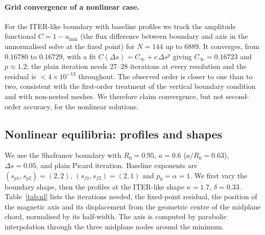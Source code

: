 \documentclass[11pt,a4paper]{article}
\begin{document}
\paragraph{Grid convergence of a nonlinear case.} For the ITER-like boundary with baseline profiles we track the amplitude functional $C=1-u_{\min}$ (the flux difference between boundary and axis in the unnormalised solve at the fixed point) for $N=144$ up to $6889$. It converges, from $0.16780$ to $0.16729$, with a fit $C(\Delta s)=C_\infty+c\,\Delta s^{p}$ giving $C_\infty=0.16723$ and $p\approx1.2$; the plain iteration needs $27$--$28$ iterations at every resolution and the residual is $<4\times10^{-13}$ throughout. The observed order is closer to one than to two, consistent with the first-order treatment of the vertical boundary condition and with non-nested meshes. We therefore claim convergence, but not second-order accuracy, for the nonlinear solutions.

\subsection{Nonlinear equilibria: profiles and shapes}\label{sec:profiles}
We use the Shafranov boundary with $R_0=0.95$, $a=0.6$ ($a/R_0=0.63$), $\Delta s=0.05$, and plain Picard iteration. Baseline exponents are $(s_{p1},s_{p2})=(2,2)$, $(s_{f1},s_{f2})=(2,1)$ and $p_0=\alpha=1$. We first vary the boundary shape, then the profiles at the ITER-like shape $\kappa=1.7$, $\delta=0.33$. Table~\ref{tab:nl} lists the iterations needed, the fixed-point residual, the position of the magnetic axis and its displacement from the geometric centre of the midplane chord, normalised by its half-width. The axis is computed by parabolic interpolation through the three midplane nodes around the minimum.
\end{document}
